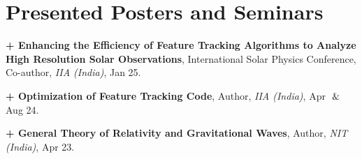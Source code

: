 \section{Presented Posters and Seminars}
        \begin{onecolentry}
            \textbf{+ Enhancing the Efficiency of Feature Tracking Algorithms to Analyze High Resolution Solar Observations},
            International Solar Physics Conference, Co-author, \textit{IIA (India)}, Jan 25. \href{https://drive.google.com/file/d/1bCc9i4wjVn5lyty332LAke9e0cuBgU4T/view?usp=sharing}{\faExternalLink}
        \end{onecolentry}
        
        \vspace{0.1 cm}
        
        \begin{onecolentry}
            \textbf{+ Optimization of Feature Tracking Code}, 
            Author, \textit{IIA (India)},  
            Apr $\And$ Aug 24. \href{https://drive.google.com/file/d/1HF2-5pv9Uw0ptY_NUAOVKVGC2DU61JUH/view?usp=sharing}{\faExternalLink}
        \end{onecolentry}
        
        \vspace{0.1 cm}
        
        \begin{onecolentry}
            \textbf{+ General Theory of Relativity and Gravitational Waves},
            Author, \textit{NIT (India)}, Apr 23. \href{https://drive.google.com/file/d/1QsIlgT7jfK393iZ_vvL9Ilg2SSc8cGCh/view?usp=sharing}{{\faExternalLink}}
            
        \end{onecolentry}

            
        
